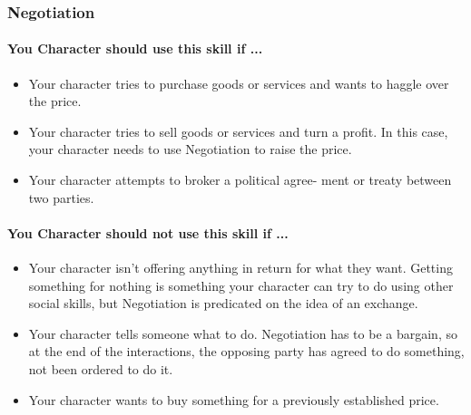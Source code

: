 \begin{multicols}{2}
\subsubsection{Negotiation}\label{skill:negotiation}
\paragraph{You Character should use this skill if ...}
\begin{itemize}
    \item Your character tries to purchase goods or services and wants to haggle
        over the price.
    \item Your character tries to sell goods or services and turn a profit. In
        this case, your character needs to use Negotiation to raise the price.
    \item Your character attempts to broker a political agree- ment or treaty
        between two parties.
\end{itemize}
\paragraph{You Character should not use this skill if ...}
\begin{itemize}
    \item Your character isn't offering anything in return for what they want.
        Getting something for nothing is something your character can try to do
        using other social skills, but Negotiation is predicated on the idea of
        an exchange.
    \item Your character tells someone what to do. Negotiation has to be a bargain,
        so at the end of the interactions, the opposing party has agreed to do
        something, not been ordered to do it.
    \item Your character wants to buy something for a previously established
        price.
\end{itemize}

\end{multicols}
